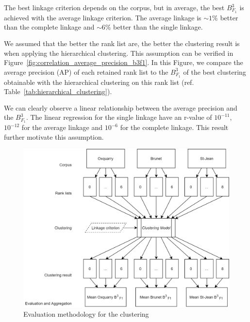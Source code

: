 The best linkage criterion depends on the corpus, but in average, the best $B^3_{F_1}$ is achieved with the average linkage criterion.
The average linkage is $\sim 1\%$ better than the complete linkage and $\sim 6\%$ better than the single linkage.

We assumed that the better the rank list are, the better the clustering result is when applying the hierarchical clustering.
This assumption can be verified in Figure~\ref{fig:correlation_average_precision_b3f1}.
In this Figure, we compare the average precision (AP) of each retained rank list to the $B^3_{F_1}$ of the best clustering obtainable with the hierarchical clustering on this rank list (ref. Table~\ref{tab:hierarchical_clustering}).

We can clearly observe a linear relationship between the average precision and the $B^3_{F_1}$.
The linear regression for the single linkage have an r-value of $10^{-11}$, $10^{-12}$ for the average linkage and $10^{-6}$ for the complete linkage.
This result further motivate this assumption.

\begin{figure}
  \centering
  \caption{Evaluation methodology for the clustering}
  \label{fig:clustering_evaluation_methodology}
  \includegraphics[width=0.7\linewidth]{img/clustering_evaluation_methodology.png}
\end{figure}

